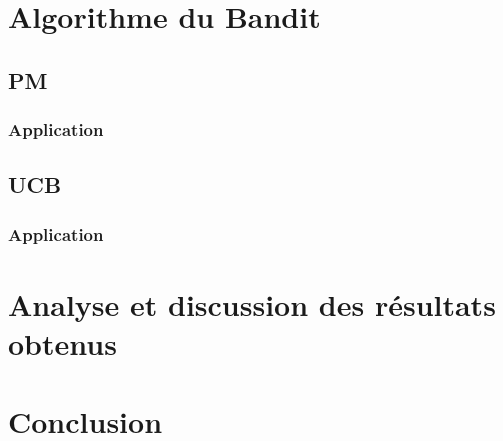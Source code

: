 \documentclass[12pt]{article}
\begin{document}
\section{Algorithme du Bandit}
	\subsection{PM}
		\subsubsection{Application}
	\subsection{UCB}
		\subsubsection{Application}

\section{Analyse et discussion des résultats obtenus}

\section{Conclusion}
\end{document}
